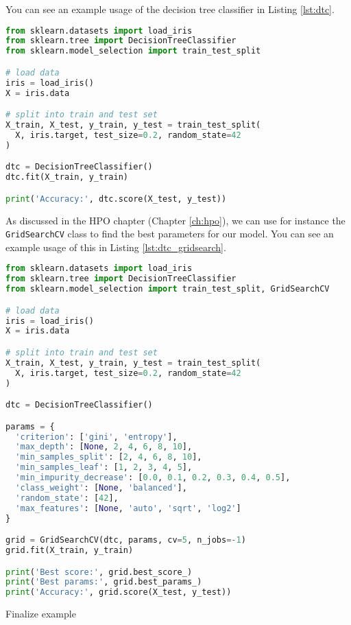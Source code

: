 You can see an example usage of the decision tree classifier in Listing \ref{lst:dtc}.
\begin{lstlisting}[language=Python, caption={Example usage of the decision tree classifier.}, label={lst:dtc}]
from sklearn.datasets import load_iris
from sklearn.tree import DecisionTreeClassifier
from sklearn.model_selection import train_test_split

# load data
iris = load_iris()
X = iris.data

# split into train and test set
X_train, X_test, y_train, y_test = train_test_split(
  X, iris.target, test_size=0.2, random_state=42
)

dtc = DecisionTreeClassifier()
dtc.fit(X_train, y_train)

print('Accuracy:', dtc.score(X_test, y_test))
\end{lstlisting}
As discussed in the HPO chapter (Chapter \ref{ch:hpo}), we can use for instance the \texttt{GridSearchCV} class to find the best parameters for our model.
You can see an example usage of this in Listing \ref{lst:dtc_gridsearch}.
\begin{lstlisting}[language=Python, caption={Example usage of the decision tree classifier with grid search.}, label={lst:dtc_gridsearch}]
from sklearn.datasets import load_iris
from sklearn.tree import DecisionTreeClassifier
from sklearn.model_selection import train_test_split, GridSearchCV

# load data
iris = load_iris()
X = iris.data

# split into train and test set
X_train, X_test, y_train, y_test = train_test_split(
  X, iris.target, test_size=0.2, random_state=42
)

dtc = DecisionTreeClassifier()

params = {
  'criterion': ['gini', 'entropy'],
  'max_depth': [None, 2, 4, 6, 8, 10],
  'min_samples_split': [2, 4, 6, 8, 10],
  'min_samples_leaf': [1, 2, 3, 4, 5],
  'min_impurity_decrease': [0.0, 0.1, 0.2, 0.3, 0.4, 0.5],
  'class_weight': [None, 'balanced'],
  'random_state': [42],
  'max_features': [None, 'auto', 'sqrt', 'log2']
}

grid = GridSearchCV(dtc, params, cv=5, n_jobs=-1)
grid.fit(X_train, y_train)

print('Best score:', grid.best_score_)
print('Best params:', grid.best_params_)
print('Accuracy:', grid.score(X_test, y_test))
\end{lstlisting}



\framedtext{\color{red}{TODO:}} Finalize example


